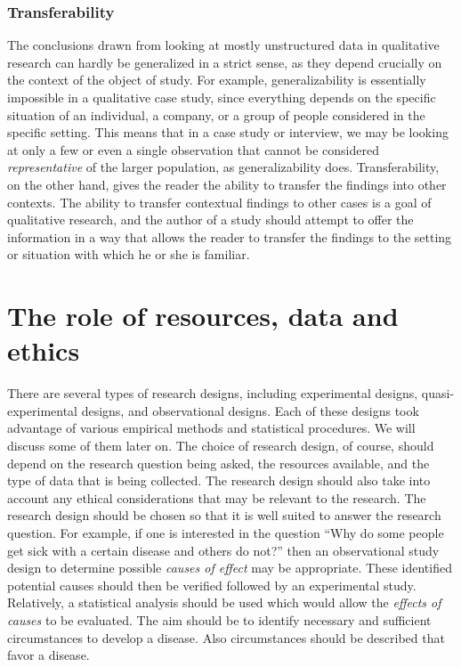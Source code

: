 \documentclass[
  12pt,
  oneside]{book}
\theoremstyle{definition}
\theoremstyle{definition}
\theoremstyle{definition}
\theoremstyle{definition}
\theoremstyle{remark}
\begin{document}
\hypertarget{transferability}{%
\subsubsection*{Transferability}\label{transferability}}

The conclusions drawn from looking at mostly unstructured data in qualitative research can hardly be generalized in a strict sense, as they depend crucially on the context of the object of study. For example, generalizability is essentially impossible in a qualitative case study, since everything depends on the specific situation of an individual, a company, or a group of people considered in the specific setting. This means that in a case study or interview, we may be looking at only a few or even a single observation that cannot be considered \emph{representative} of the larger population, as generalizability does. Transferability, on the other hand, gives the reader the ability to transfer the findings into other contexts. The ability to transfer contextual findings to other cases is a goal of qualitative research, and the author of a study should attempt to offer the information in a way that allows the reader to transfer the findings to the setting or situation with which he or she is familiar.

\hypertarget{the-role-of-resources-data-and-ethics}{%
\section{The role of resources, data and ethics}\label{the-role-of-resources-data-and-ethics}}

There are several types of research designs, including experimental designs, quasi-experimental designs, and observational designs. Each of these designs took advantage of various empirical methods and statistical procedures. We will discuss some of them later on. The choice of research design, of course, should depend on the research question being asked, the resources available, and the type of data that is being collected. The research design should also take into account any ethical considerations that may be relevant to the research.
The research design should be chosen so that it is well suited to answer the research question. For example, if one is interested in the question ``Why do some people get sick with a certain disease and others do not?'' then an observational study design to determine possible \emph{causes of effect} may be appropriate. These identified potential causes should then be verified followed by an experimental study. Relatively, a statistical analysis should be used which would allow the \emph{effects of causes} to be evaluated. The aim should be to identify necessary and sufficient circumstances to develop a disease. Also circumstances should be described that favor a disease.
\end{document}
